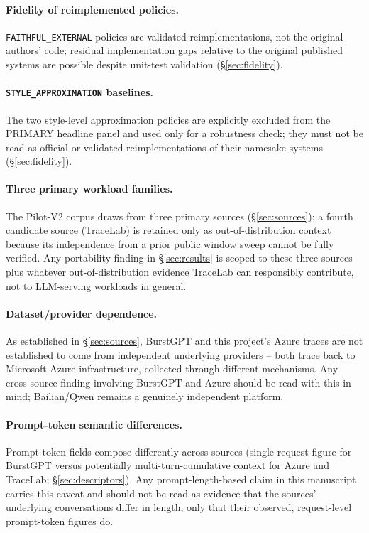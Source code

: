 \documentclass[sn-basic,Numbered,pdflatex]{sn-jnl}
\begin{document}
\paragraph{Fidelity of reimplemented policies.} \texttt{FAITHFUL\_EXTERNAL}
policies are validated reimplementations, not the original authors' code;
residual implementation gaps relative to the original published systems
are possible despite unit-test validation (\S\ref{sec:fidelity}).

\paragraph{\texttt{STYLE\_APPROXIMATION} baselines.} The two style-level
approximation policies are explicitly excluded from the PRIMARY headline
panel and used only for a robustness check; they must not be read as
official or validated reimplementations of their namesake systems
(\S\ref{sec:fidelity}).

\paragraph{Three primary workload families.} The Pilot-V2 corpus draws from
three primary sources (\S\ref{sec:sources}); a fourth candidate source
(TraceLab) is retained only as out-of-distribution context because its
independence from a prior public window sweep cannot be fully verified.
Any portability finding in \S\ref{sec:results} is scoped to these three
sources plus whatever out-of-distribution evidence TraceLab can
responsibly contribute, not to LLM-serving workloads in general.

\paragraph{Dataset/provider dependence.} As established in
\S\ref{sec:sources}, BurstGPT and this project's Azure traces are not
established to come from independent underlying providers -- both trace
back to Microsoft Azure infrastructure, collected through different
mechanisms. Any cross-source finding involving BurstGPT and Azure should be
read with this in mind; Bailian/Qwen remains a genuinely independent
platform.

\paragraph{Prompt-token semantic differences.} Prompt-token fields compose
differently across sources (single-request figure for BurstGPT versus
potentially multi-turn-cumulative context for Azure and TraceLab;
\S\ref{sec:descriptors}). Any prompt-length-based claim in this manuscript
carries this caveat and should not be read as evidence that the sources'
underlying conversations differ in length, only that their observed,
request-level prompt-token figures do.
\end{document}
